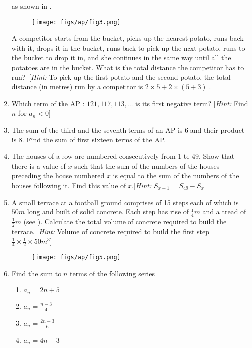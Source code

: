 \begin{enumerate}[label=\thesubsection.\arabic*, ref=\thesubsection.\theenumi]
		as shown in .
	\begin{figure}[H]
		\centering
\texttt{[image: figs/ap/fig3.png]} 
		\caption{}
		\label{fig:fig3}
	\end{figure}
A competitor starts from the bucket,  picks up the nearest potato,  runs back with it,  drops it in the bucket,  runs back to pick up the next potato,  runs to the bucket to drop it in,  and she continues in the same way until all the potatoes are in the bucket. What is the total distance the competitor has to run?\
[{\em Hint:} To pick up the first potato and the second potato,  the total distance (in metres)
run by a competitor is $2 \times 5 + 2 \times (5 + 3)$].
\item Which term of the AP : $121,  117,  113, \dots $ is its first negative term? [{\em Hint:} Find $n$ for $a_n < 0$]
\item The sum of the third and the seventh terms of an AP is 6 and their product is 8. Find the sum of first sixteen terms of the AP.
\item The houses of a row are numbered consecutively from 1 to 49. Show that there is a value of $x$ such that the sum of the numbers of the houses preceding the house numbered $x$ is equal to the sum of the numbers of the houses following it. Find this value of $x$.[{\em Hint:} $S_{x-1} = S_{49} -S_x$]
\item A small terrace at a football ground comprises of 15 steps each of which is $50 m$ long and built of solid concrete. Each step has rise of $\frac{1}{4}m$ and a tread of $\frac{1}{2}m$ 
	(see \figref{fig:fig5}).
	Calculate the total volume of concrete required to build the terrace. [{\em Hint:} Volume of concrete required to build the first step = $\frac{1}{4} \times \frac{1}{2} \times 50m^3$]
	\begin{figure}[H]
		\centering
\texttt{[image: figs/ap/fig5.png]}  
		\caption{}
		\label{fig:fig5}
	\end{figure}
\item Find the sum to $n$ terms of the following series
	\begin{multicols}{4}
\begin{enumerate}
	\item $a_n =2n+5$
	\item $a_n =\frac{n-3}{4}$
\item $a_n = \frac{2n-3}{6}$
\item $a_n = 4n-3 $
\end{enumerate}
\end{multicols}

\end{enumerate}
